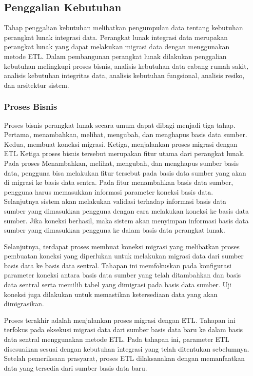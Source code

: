 \subsection{Penggalian Kebutuhan}
Tahap penggalian kebutuhan melibatkan pengumpulan data tentang kebutuhan perangkat lunak integrasi data. Perangkat lunak integrasi data merupakan perangkat lunak yang dapat melakukan migrasi data dengan menggunakan metode ETL. Dalam pembangunan perangkat lunak dilakukan penggalian kebutuhan melingkupi proses bisnis, analisis kebutuhan data cabang rumah sakit, analisis kebutuhan integritas data, analisis kebutuhan fungsional, analisis resiko, dan arsitektur sistem.

\subsubsection{Proses Bisnis}
Proses bisnis perangkat lunak secara umum dapat dibagi menjadi tiga tahap. Pertama, menambahkan, melihat, mengubah, dan menghapus basis data sumber. Kedua, membuat koneksi migrasi. Ketiga, menjalankan proses migrasi dengan ETL Ketiga proses bisnis tersebut merupakan fitur utama dari perangkat lunak. Pada proses Menambahkan, melihat, mengubah, dan menghapus sumber basis data, pengguna bisa melakukan fitur tersebut pada basis data sumber yang akan di migrasi ke basis data sentra. Pada fitur menambahkan basis data sumber, pengguna harus memasukkan informasi parameter koneksi basis data. Selanjutnya sistem akan melakukan validasi terhadap informasi basis data sumber yang dimasukkan pengguna dengan cara melakukan koneksi ke basis data sumber. Jika koneksi berhasil, maka sistem akan menyimpan informasi basis data sumber yang dimasukkan pengguna ke dalam basis data perangkat lunak. 

Selanjutnya, terdapat proses membuat koneksi migrasi yang melibatkan proses pembuatan koneksi yang diperlukan untuk melakukan migrasi data dari sumber basis data ke basis data sentral. Tahapan ini memfokuskan pada konfigurasi parameter koneksi antara basis data sumber yang telah ditambahkan dan basis data sentral serta memilih tabel yang dimigrasi pada basis data sumber. Uji koneksi juga dilakukan untuk memastikan ketersediaan data yang akan dimigrasikan.

Proses terakhir adalah menjalankan proses migrasi dengan ETL. Tahapan ini terfokus pada eksekusi migrasi data dari sumber basis data baru ke dalam basis data sentral menggunakan metode ETL. Pada tahapan ini, parameter ETL disesuaikan sesuai dengan kebutuhan integrasi yang telah ditentukan sebelumnya. Setelah pemeriksaan prasyarat, proses ETL dilaksanakan dengan memanfaatkan data yang tersedia dari sumber basis data baru.

